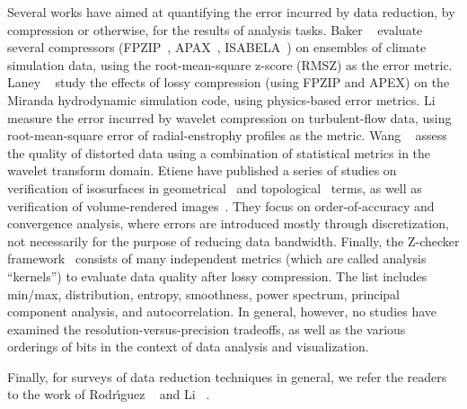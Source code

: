 Several works have aimed at quantifying the error incurred by data reduction, by
compression or otherwise, for the results of analysis tasks. Baker
\etal~\cite{evaluating-compression-climate} evaluate several compressors (FPZIP~\cite{fpzip},
APAX~\cite{apax}, ISABELA~\cite{isabela}) on ensembles of climate simulation data, using the
root-mean-square z-score (RMSZ) as the error metric. Laney \etal~\cite{compression_sim2013} study
the effects of lossy compression (using FPZIP and APEX) on the Miranda hydrodynamic simulation code,
using physics-based error metrics. Li \etal~\cite{evaluating-efficacy-wavelet} measure the error
incurred by wavelet compression on turbulent-flow data, using root-mean-square error of
radial-enstrophy profiles as the metric. Wang \etal~\cite{statistical-volume-quality} assess the
quality of distorted data using a combination of statistical metrics in the wavelet transform
domain. Etiene \etal have published a series of studies on verification of isosurfaces in
geometrical~\cite{verifiable-isosurface} and topological~\cite{topology-verification-isosurface}
terms, as well as verification of volume-rendered images~\cite{verifying-volume-rendering}. They
focus on order-of-accuracy and convergence analysis, where errors are introduced mostly through
discretization, not necessarily for the purpose of reducing data bandwidth. Finally, the Z-checker
framework~\cite{z-checker} consists of many independent metrics (which are called analysis
``kernels'') to evaluate data quality after lossy compression. The list includes min/max,
distribution, entropy, smoothness, power spectrum, principal component analysis, and
autocorrelation. In general, however, no studies have examined the
resolution-versus-precision tradeoffs, as well as the various orderings of bits in the context of
data analysis and visualization.


Finally, for surveys of data reduction techniques in general, we refer the readers to the work of
Rodr\'{\i}guez \etal~\cite{state-of-the-art-compressed-volume} and Li \etal~\cite{li2018}.
